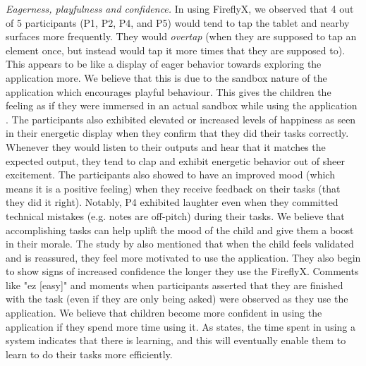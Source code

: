 \textit{Eagerness, playfulness and confidence.} In using FireflyX, we observed that 4 out of 5 participants (P1, P2, P4, and P5) would tend to tap the tablet and nearby surfaces more frequently. They would \textit{overtap} (when they are supposed to tap an element once, but instead would tap it more times that they are supposed to). This appears to be like a display of eager behavior towards exploring the application more. We believe that this is due to the sandbox nature of the application which encourages playful behaviour. This gives the children the feeling as if they were immersed in an actual sandbox while using the application \cite{inal2007flow}. The participants also exhibited elevated or increased levels of happiness as seen in their energetic display when they confirm that they did their tasks correctly.  Whenever they would listen to their outputs and hear that it matches the expected output, they tend to clap and exhibit energetic behavior out of sheer excitement. The participants also showed to have an improved mood (which means it is a positive feeling) when they receive feedback on their tasks (that they did it right). Notably, P4 exhibited laughter even when they committed technical mistakes (e.g. notes are off-pitch) during their tasks. We believe that accomplishing tasks can help uplift the mood of the child and give them a boost in their morale. The study by  also mentioned that when the child feels validated and is reassured, they feel more motivated to use the application. They also begin to show signs of increased confidence the longer they use the FireflyX. Comments like "ez [easy]" and moments when participants asserted that they are finished with the task (even if they are only being asked) were observed as they use the application. We believe that children become more confident in using the application if they spend more time using it. As  states, the time spent in using a system indicates that there is learning, and this will eventually enable them to learn to do their tasks more efficiently.

